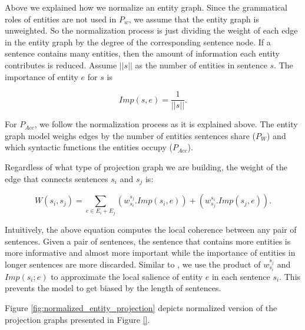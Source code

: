 Above we explained how we normalize an entity graph. 
Since the grammatical roles of entities are not used in $P_w$,  we assume that the entity graph is unweighted. 
So the normalization process is just dividing the weight of each edge in the entity graph by the degree of the corresponding sentence node. 
If a sentence contains many entities, then the amount of information each entity contributes is reduced.
Assume $||s||$ as the number of entities in sentence $s$.  
The importance of entity $e$ for $s$ is 

\begin{equation}
Imp(s,e) = \frac{1}{||s||}.
\end{equation}

For $P_{Acc}$, we follow the normalization process as it is explained above. 
The entity graph model weighs edges by the number of entities sentences share ($P_W$) and which syntactic functions the entities occupy ($P_{Acc}$). 


Regardless of what type of projection graph we are building, the weight of the edge that connects sentences $s_i$ and $s_j$ is:

\begin{equation}
W(s_i,s_j) = \sum_{e \in E_i+E_j}{(w_{s_i}^{s_j}.Imp(s_i,e))+(w_{s_j}^{s_i}.Imp(s_j,e))}.
\end{equation}

Intuitively, the above equation computes the local coherence between any pair of sentences. 
Given a pair of sentences, the sentence that contains more entities is more informative and almost more important while the importance of entities in longer sentences are more discarded. 
Similar to \cite{rode08}, we use the product of $w_{s_i}^{s_j}$ and $Imp(s_i; e)$ to approximate the local salience of entity $e$ in each sentence $s_i$. 
This prevents the model to get biased by the length of sentences. 

Figure \ref{fig:normalized_entity_projection} depicts normalized version of the projection graphs presented in Figure \ref{}. 


